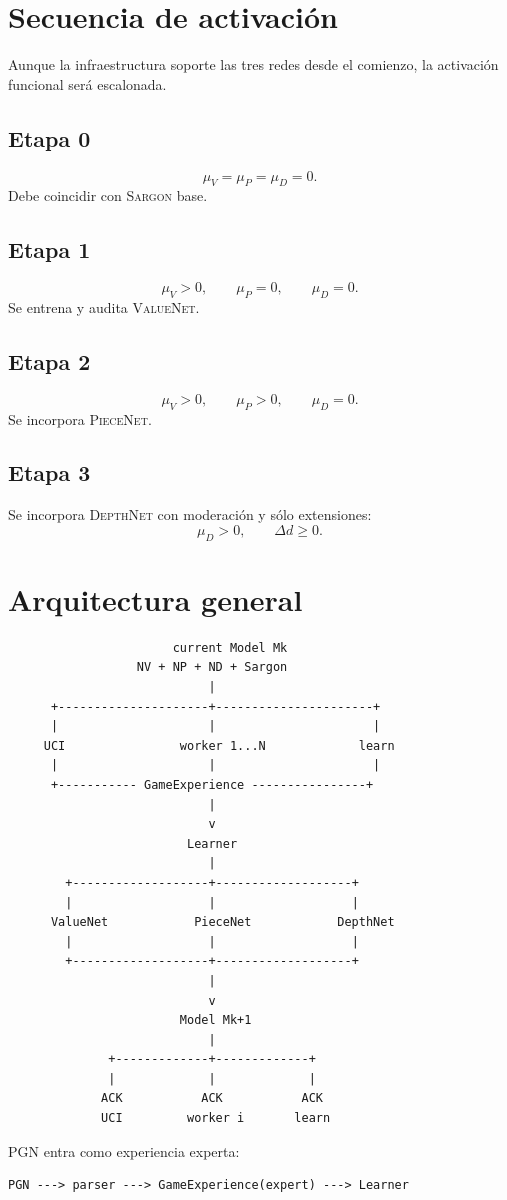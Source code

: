 \documentclass[11pt,a4paper]{article}
\newcommand{\Sargon}{\textsc{Sargon}}
\newcommand{\ValueNet}{\textsc{ValueNet}}
\newcommand{\PieceNet}{\textsc{PieceNet}}
\newcommand{\DepthNet}{\textsc{DepthNet}}
\begin{document}
\section{Secuencia de activación}
Aunque la infraestructura soporte las tres redes desde el comienzo, la activación funcional será escalonada.

\subsection{Etapa 0}
\[
\mu_V=\mu_P=\mu_D=0.
\]
Debe coincidir con \Sargon{} base.

\subsection{Etapa 1}
\[
\mu_V>0,\qquad\mu_P=0,\qquad\mu_D=0.
\]
Se entrena y audita \ValueNet{}.

\subsection{Etapa 2}
\[
\mu_V>0,\qquad\mu_P>0,\qquad\mu_D=0.
\]
Se incorpora \PieceNet{}.

\subsection{Etapa 3}
Se incorpora \DepthNet{} con moderación y sólo extensiones:
\[
\mu_D>0,\qquad\Delta d\ge0.
\]

\section{Arquitectura general}
\begin{verbatim}
                       current Model Mk
                  NV + NP + ND + Sargon
                            |
      +---------------------+----------------------+
      |                     |                      |
     UCI                worker 1...N             learn
      |                     |                      |
      +----------- GameExperience ----------------+
                            |
                            v
                         Learner
                            |
        +-------------------+-------------------+
        |                   |                   |
      ValueNet            PieceNet            DepthNet
        |                   |                   |
        +-------------------+-------------------+
                            |
                            v
                        Model Mk+1
                            |
              +-------------+-------------+
              |             |             |
             ACK           ACK           ACK
             UCI         worker i       learn
\end{verbatim}
PGN entra como experiencia experta:
\begin{verbatim}
PGN ---> parser ---> GameExperience(expert) ---> Learner
\end{verbatim}
\end{document}

